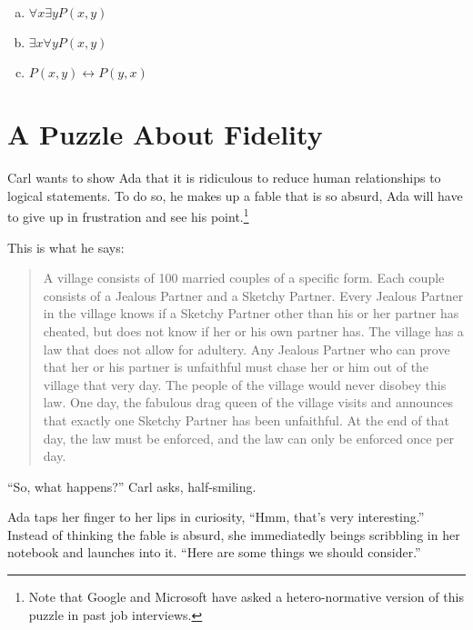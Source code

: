 \documentclass{article}
\begin{document}
\begin{enumerate}[(a)]
\item
$\forall x \exists y P(x,y)$
\item
$\exists x \forall y P(x,y)$
\item
$P(x,y) \leftrightarrow P(y,x)$
\end{enumerate}

\section{A Puzzle About Fidelity}

Carl wants to show Ada that it is ridiculous to reduce human
relationships to logical statements. To do so, he makes up a
fable that is so absurd, Ada will have to give up in frustration
and see his point.\footnote{Note that Google and Microsoft have
asked a hetero-normative version of this puzzle in past job
interviews.}

This is what he says:

\begin{quote}
A village consists of 100 married couples of a specific form.
Each couple consists of a Jealous Partner and a Sketchy
Partner.
Every Jealous Partner in the village knows if
a Sketchy Partner other than his or her partner has cheated, but does not
know if her or his own partner has.
The village has a law that does not allow for adultery.
Any Jealous Partner who can prove that her or his partner
is unfaithful must chase her or him out of
the village that very day.
The people of the village would never disobey this law.
One day, the fabulous drag queen of the village visits and
announces that exactly one Sketchy Partner has been unfaithful.
At the end of that day, the law must be enforced,
and the law can only be enforced once per day.
\end{quote}

``So, what happens?'' Carl asks, half-smiling.

Ada taps her finger to her lips in curiosity,
``Hmm, that's very interesting.'' Instead of
thinking the fable is absurd, she immediatedly
beings scribbling in her notebook and launches
into it. ``Here are some things we should
consider.''
\end{document}
